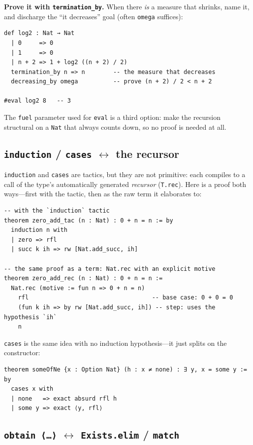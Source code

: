 \documentclass[11pt,a4paper]{article}
\theoremstyle{definition}
\begin{document}
\textbf{Prove it with \texttt{termination\_by}.} When there \emph{is} a measure
that shrinks, name it, and discharge the ``it decreases'' goal (often
\texttt{omega} suffices):

\begin{verbatim}
def log2 : Nat → Nat
  | 0     => 0
  | 1     => 0
  | n + 2 => 1 + log2 ((n + 2) / 2)
  termination_by n => n        -- the measure that decreases
  decreasing_by omega          -- prove (n + 2) / 2 < n + 2

#eval log2 8   -- 3
\end{verbatim}

The \texttt{fuel} parameter used for \texttt{eval} is a third option: make the
recursion structural on a \texttt{Nat} that always counts down, so no proof is
needed at all.

\subsection*{\texttt{induction} / \texttt{cases} $\leftrightarrow$ the recursor}

\texttt{induction} and \texttt{cases} are tactics, but they are not primitive:
each compiles to a call of the type's automatically generated \emph{recursor}
(\texttt{T.rec}). Here is a proof both ways---first with the tactic, then as the
raw term it elaborates to:

\begin{verbatim}
-- with the `induction` tactic
theorem zero_add_tac (n : Nat) : 0 + n = n := by
  induction n with
  | zero => rfl
  | succ k ih => rw [Nat.add_succ, ih]

-- the same proof as a term: Nat.rec with an explicit motive
theorem zero_add_rec (n : Nat) : 0 + n = n :=
  Nat.rec (motive := fun n => 0 + n = n)
    rfl                                   -- base case: 0 + 0 = 0
    (fun k ih => by rw [Nat.add_succ, ih]) -- step: uses the hypothesis `ih`
    n
\end{verbatim}

\texttt{cases} is the same idea with no induction hypothesis---it just splits on
the constructor:

\begin{verbatim}
theorem someOfNe {x : Option Nat} (h : x ≠ none) : ∃ y, x = some y := by
  cases x with
  | none   => exact absurd rfl h
  | some y => exact ⟨y, rfl⟩
\end{verbatim}

\subsection*{\texttt{obtain ⟨…⟩} $\leftrightarrow$ \texttt{Exists.elim} / \texttt{match}}
\end{document}
